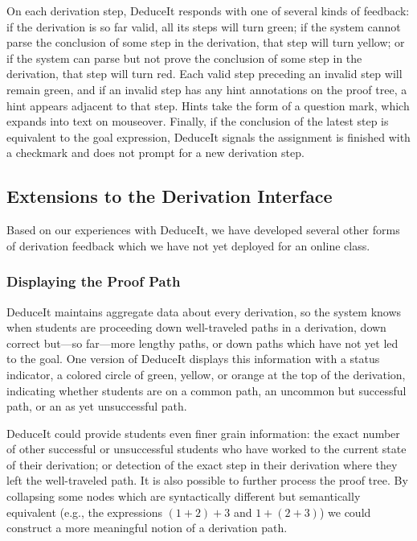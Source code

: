 \documentclass{sigchi}
\newcommand{\msb}[1]{\textbf{\textcolor{cyan}{Michael: #1}}}
\begin{document}
On each derivation step, DeduceIt responds with one of several kinds of feedback: if the derivation is so far valid, all its steps will turn green; if the system cannot parse the conclusion of some step in the derivation, that step will turn yellow; or if the system can parse but not prove the conclusion of some step in the derivation, that step will turn red. Each valid step preceding an invalid step will remain green, and if an invalid step has any hint annotations on the proof tree, a hint appears adjacent to that step. Hints take the form of a question mark, which expands into text on mouseover. Finally, if the conclusion of the latest step is equivalent to the goal expression, DeduceIt signals the assignment is finished with a checkmark and does not prompt for a new derivation step.

\subsection{Extensions to the Derivation Interface}

Based on our experiences with DeduceIt, we have developed several other forms of derivation feedback which we have not yet deployed for an online class.

\subsubsection{Displaying the Proof Path}

DeduceIt maintains aggregate data about every derivation, so the system knows when students are proceeding down well-traveled paths in a derivation, down correct but---so far---more lengthy paths, or down paths which have not yet led to the goal. One version of DeduceIt displays this information with a status indicator, a colored circle of green, yellow, or orange at the top of the derivation, indicating whether students are on a common path, an uncommon but successful path, or an as yet unsuccessful path. 

DeduceIt could provide students even finer grain information: the exact number of other successful or unsuccessful students who have worked to the current state of their derivation; or detection of the exact step in their derivation where they left the well-traveled path. It is also possible to further process the proof tree. By collapsing some nodes which are syntactically different but semantically equivalent (e.g., the expressions $(1+2)+3$ and $1+(2+3)$) we could construct a more meaningful notion of a derivation path. %
\end{document}
